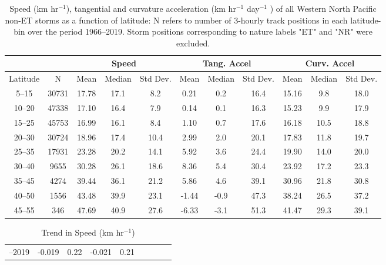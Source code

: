 \documentclass[wcd,manuscript]{copernicus}
\begin{document}
\begin{table*}[t]
\caption{Speed (km hr$^{-1}$), tangential and curvature acceleration  (km hr$^{-1}$ day$^{-1}$ ) of all Western North Pacific non-ET storms as a function of latitude: N refers to number of 3-hourly track positions in each latitude-bin over the period 1966--2019. Storm positions corresponding to 
nature labels "ET" and "NR" were excluded.}

\begin{tabular}{cc|ccc|ccc|ccc}
\tophline
& & \multicolumn{3}{|c|}{Speed} & \multicolumn{3}{c|}{Tang. Accel} & \multicolumn{3}{c}{Curv. Accel}\\
\hline
       Latitude &     N &  Mean & Median & Std Dev. & Mean & Median &  Std Dev.& Mean & Median & Std Dev.\\
	  5--15 & 30731 & 17.78 &  17.1 &   8.2 &  0.21 &   0.2 &  16.4 & 15.16 &   9.8 &  18.0 \\
	 10--20 & 47338 & 17.10 &  16.4 &   7.9 &  0.14 &   0.1 &  16.3 & 15.23 &   9.9 &  17.9 \\
	 15--25 & 45753 & 16.99 &  16.1 &   8.4 &  1.10 &   0.7 &  17.6 & 16.18 &  10.5 &  18.8 \\
	 20--30 & 30724 & 18.96 &  17.4 &  10.4 &  2.99 &   2.0 &  20.1 & 17.83 &  11.8 &  19.7 \\
	 25--35 & 17931 & 23.28 &  20.2 &  14.1 &  5.92 &   3.6 &  24.4 & 19.90 &  14.0 &  20.0 \\
	 30--40 &  9655 & 30.28 &  26.1 &  18.6 &  8.36 &   5.4 &  30.4 & 23.92 &  17.2 &  23.3 \\
	 35--45 &  4274 & 39.44 &  36.1 &  21.2 &  5.86 &   4.6 &  39.1 & 30.96 &  21.8 &  30.8 \\
	 40--50 &  1556 & 43.48 &  39.9 &  23.1 & -1.44 &  -0.9 &  47.3 & 38.24 &  26.5 &  37.2 \\
	 45--55 &   346 & 47.69 &  40.9 &  27.6 & -6.33 &  -3.1 &  51.3 & 41.47 &  29.3 &  39.1 \\
\hline
\end{tabular}
\label{tab:WPSA}
\end{table*}


\begin{table*}[t]
\caption{Trend in Speed (km hr$^{-1}$)}

\begin{tabular}{c|cc|cc|cc|cc|}
\tophline
1966--2019 & -0.019 & 0.22 & -0.021 & 0.21

\bottomhline
\end{tabular}
\label{tab:WPSA}
\end{table*}

\end{document}
